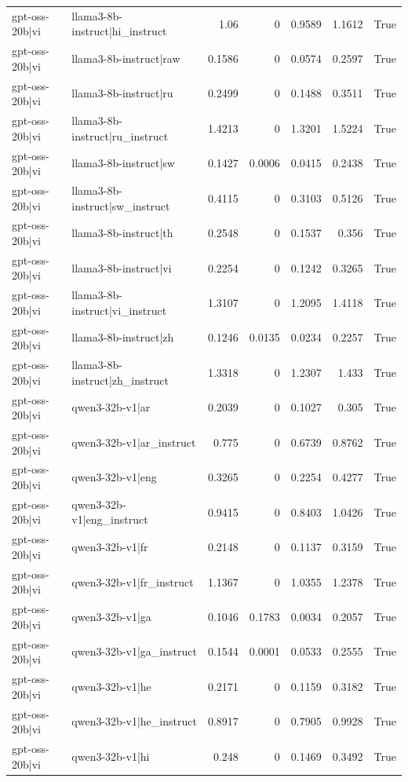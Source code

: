 \begin{table}
\begin{tabular}{l l r r r r l}
gpt-oss-20b|vi & llama3-8b-instruct|hi_instruct & 1.06 & 0 & 0.9589 & 1.1612 & True \\
gpt-oss-20b|vi & llama3-8b-instruct|raw & 0.1586 & 0 & 0.0574 & 0.2597 & True \\
gpt-oss-20b|vi & llama3-8b-instruct|ru & 0.2499 & 0 & 0.1488 & 0.3511 & True \\
gpt-oss-20b|vi & llama3-8b-instruct|ru_instruct & 1.4213 & 0 & 1.3201 & 1.5224 & True \\
gpt-oss-20b|vi & llama3-8b-instruct|sw & 0.1427 & 0.0006 & 0.0415 & 0.2438 & True \\
gpt-oss-20b|vi & llama3-8b-instruct|sw_instruct & 0.4115 & 0 & 0.3103 & 0.5126 & True \\
gpt-oss-20b|vi & llama3-8b-instruct|th & 0.2548 & 0 & 0.1537 & 0.356 & True \\
gpt-oss-20b|vi & llama3-8b-instruct|vi & 0.2254 & 0 & 0.1242 & 0.3265 & True \\
gpt-oss-20b|vi & llama3-8b-instruct|vi_instruct & 1.3107 & 0 & 1.2095 & 1.4118 & True \\
gpt-oss-20b|vi & llama3-8b-instruct|zh & 0.1246 & 0.0135 & 0.0234 & 0.2257 & True \\
gpt-oss-20b|vi & llama3-8b-instruct|zh_instruct & 1.3318 & 0 & 1.2307 & 1.433 & True \\
gpt-oss-20b|vi & qwen3-32b-v1|ar & 0.2039 & 0 & 0.1027 & 0.305 & True \\
gpt-oss-20b|vi & qwen3-32b-v1|ar_instruct & 0.775 & 0 & 0.6739 & 0.8762 & True \\
gpt-oss-20b|vi & qwen3-32b-v1|eng & 0.3265 & 0 & 0.2254 & 0.4277 & True \\
gpt-oss-20b|vi & qwen3-32b-v1|eng_instruct & 0.9415 & 0 & 0.8403 & 1.0426 & True \\
gpt-oss-20b|vi & qwen3-32b-v1|fr & 0.2148 & 0 & 0.1137 & 0.3159 & True \\
gpt-oss-20b|vi & qwen3-32b-v1|fr_instruct & 1.1367 & 0 & 1.0355 & 1.2378 & True \\
gpt-oss-20b|vi & qwen3-32b-v1|ga & 0.1046 & 0.1783 & 0.0034 & 0.2057 & True \\
gpt-oss-20b|vi & qwen3-32b-v1|ga_instruct & 0.1544 & 0.0001 & 0.0533 & 0.2555 & True \\
gpt-oss-20b|vi & qwen3-32b-v1|he & 0.2171 & 0 & 0.1159 & 0.3182 & True \\
gpt-oss-20b|vi & qwen3-32b-v1|he_instruct & 0.8917 & 0 & 0.7905 & 0.9928 & True \\
gpt-oss-20b|vi & qwen3-32b-v1|hi & 0.248 & 0 & 0.1469 & 0.3492 & True \\

\end{tabular}
\end{table}
